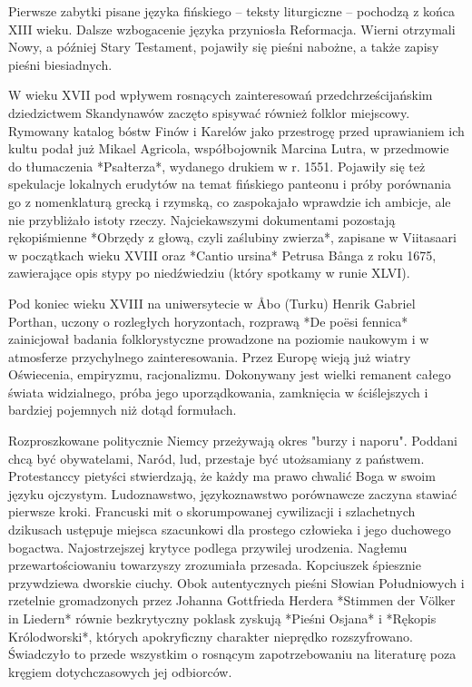 Pierwsze zabytki pisane języka fińskiego -- teksty liturgiczne -- pochodzą z końca XIII wieku. Dalsze wzbogacenie języka przyniosła Reformacja. Wierni otrzymali Nowy, a później Stary Testament, pojawiły się pieśni nabożne, a także zapisy pieśni biesiadnych.

W wieku XVII pod wpływem rosnących zainteresowań przedchrześcijańskim dziedzictwem Skandynawów zaczęto spisywać również folklor miejscowy. Rymowany katalog bóstw Finów i Karelów jako przestrogę przed uprawianiem ich kultu podał już Mikael Agricola, współbojownik Marcina Lutra, w przedmowie do tłumaczenia *Psałterza*, wydanego drukiem w r. 1551. Pojawiły się też spekulacje lokalnych erudytów na temat fińskiego panteonu i próby porównania go z nomenklaturą grecką i rzymską, co zaspokajało wprawdzie ich ambicje, ale nie przybliżało istoty rzeczy. Najciekawszymi dokumentami pozostają rękopiśmienne *Obrzędy z głową, czyli zaślubiny zwierza*, zapisane w Viitasaari w początkach wieku XVIII oraz *Cantio ursina* Petrusa Bånga z roku 1675, zawierające opis stypy po niedźwiedziu (który spotkamy w runie XLVI).

Pod koniec wieku XVIII na uniwersytecie w Åbo (Turku) Henrik Gabriel Porthan, uczony o rozległych horyzontach, rozprawą *De poësi fennica* zainicjował badania folklorystyczne prowadzone na poziomie naukowym i w atmosferze przychylnego zainteresowania. Przez Europę wieją już wiatry Oświecenia, empiryzmu, racjonalizmu. Dokonywany jest wielki remanent całego świata widzialnego, próba jego uporządkowania, zamknięcia w ściślejszych i bardziej pojemnych niż dotąd formułach.

Rozproszkowane politycznie Niemcy przeżywają okres "burzy i naporu". Poddani chcą być obywatelami, Naród, lud, przestaje być utożsamiany z państwem. Protestanccy pietyści stwierdzają, że każdy ma prawo chwalić Boga w swoim języku ojczystym. Ludoznawstwo, językoznawstwo porównawcze zaczyna stawiać pierwsze kroki. Francuski mit o skorumpowanej cywilizacji i szlachetnych dzikusach ustępuje miejsca szacunkowi dla prostego człowieka i jego duchowego bogactwa. Najostrzejszej krytyce podlega przywilej urodzenia. Nagłemu przewartościowaniu towarzyszy zrozumiała przesada. Kopciuszek śpiesznie przywdziewa dworskie ciuchy. Obok autentycznych pieśni Słowian Południowych i rzetelnie gromadzonych przez Johanna Gottfrieda Herdera *Stimmen der Völker in Liedern* równie bezkrytyczny poklask zyskują *Pieśni Osjana* i *Rękopis Królodworski*, których apokryficzny charakter nieprędko rozszyfrowano. Świadczyło to przede wszystkim o rosnącym zapotrzebowaniu na literaturę poza kręgiem dotychczasowych jej odbiorców.

